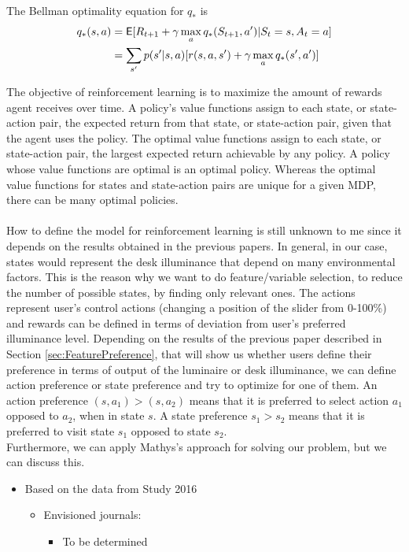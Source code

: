 \documentclass[a4paper]{article}
\begin{document}
The Bellman optimality equation for $q_{*}$ is
\begin{align*}
q_{*}(s,a) &=\operatorname{\mathsf{E}}[R_{t+1}+ \gamma \max_{a}q_{*}(S_{t+1},a')|S_t = s, A_t = a] \\
&=  \sum\limits_{s'}p(s'|s,a)[r(s,a,s') + \gamma \max_{a}q_{*}(s',a')]
\end{align*}


The objective of reinforcement learning is to maximize the amount of rewards agent receives over time. A policy's value functions assign to each state, or state-action pair, the expected return from that state, or state-action pair, given that the agent uses the policy. The optimal value functions assign to each state, or state-action pair, the largest expected return achievable by any policy. A policy whose value functions are optimal is an optimal policy. Whereas the optimal value functions for states and state-action pairs are unique for a given MDP, there can be many optimal policies.
\\\\
\color{red} How to define the model for reinforcement learning is still unknown to me since it depends on the results obtained in the previous papers. In general, in our case, states would represent the desk illuminance that depend on many environmental factors. This is the reason why we want to do feature/variable selection, to reduce the number of possible states, by finding only relevant ones. The actions represent user's control actions (changing a position of the slider from 0-100\%) and rewards can be defined in terms of deviation from user's preferred illuminance level. Depending on the results of the previous paper described in Section \ref{sec:FeaturePreference}, that will show us whether users define their preference in terms of output of the luminaire or desk illuminance, we can define action preference or state preference and try to optimize for one of them. An action preference $(s, a_1) > (s, a_2)$ means that it is preferred to select action $a_1$ opposed to $a_2$, when in state $s$.  A state preference $s_1>  s_2$ means that it is preferred to visit state $s_1$ opposed to state $s_2$. 
\\
\indent Furthermore, we can apply Mathys's approach for solving our problem, but we can discuss this.

\color{black}
\begin{itemize}
	\item{Based on the data from Study 2016}
	\begin{itemize}
		\item Envisioned journals:
			\begin{itemize}
				\color{blue}
				\item To be determined
			\end{itemize}
	\end{itemize}
\end{itemize}
\end{document}
